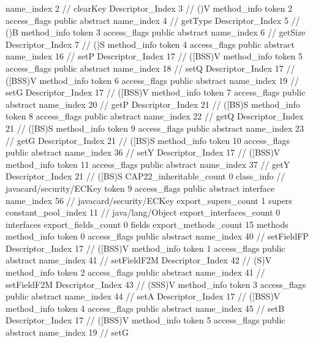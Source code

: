 {{{{{					name_index	2		// clearKey
					Descriptor_Index	3		// ()V
				}
				method_info {
					token	2
					access_flags	public abstract
					name_index	4		// getType
					Descriptor_Index	5		// ()B
				}
				method_info {
					token	3
					access_flags	public abstract
					name_index	6		// getSize
					Descriptor_Index	7		// ()S
				}
				method_info {
					token	4
					access_flags	public abstract
					name_index	16		// setP
					Descriptor_Index	17		// ([BSS)V
				}
				method_info {
					token	5
					access_flags	public abstract
					name_index	18		// setQ
					Descriptor_Index	17		// ([BSS)V
				}
				method_info {
					token	6
					access_flags	public abstract
					name_index	19		// setG
					Descriptor_Index	17		// ([BSS)V
				}
				method_info {
					token	7
					access_flags	public abstract
					name_index	20		// getP
					Descriptor_Index	21		// ([BS)S
				}
				method_info {
					token	8
					access_flags	public abstract
					name_index	22		// getQ
					Descriptor_Index	21		// ([BS)S
				}
				method_info {
					token	9
					access_flags	public abstract
					name_index	23		// getG
					Descriptor_Index	21		// ([BS)S
				}
				method_info {
					token	10
					access_flags	public abstract
					name_index	36		// setY
					Descriptor_Index	17		// ([BSS)V
				}
				method_info {
					token	11
					access_flags	public abstract
					name_index	37		// getY
					Descriptor_Index	21		// ([BS)S
				}
			}
			CAP22_inheritable_count	0
		}
		class_info {		// javacard/security/ECKey
			token	9
			access_flags	public abstract interface
			name_index	56		// javacard/security/ECKey
			export_supers_count	1
			supers {
				constant_pool_index	11		// java/lang/Object
			}
			export_interfaces_count	0
			interfaces {
			}
			export_fields_count	0
			fields {
			}
			export_methods_count	15
			methods {
				method_info {
					token	0
					access_flags	public abstract
					name_index	40		// setFieldFP
					Descriptor_Index	17		// ([BSS)V
				}
				method_info {
					token	1
					access_flags	public abstract
					name_index	41		// setFieldF2M
					Descriptor_Index	42		// (S)V
				}
				method_info {
					token	2
					access_flags	public abstract
					name_index	41		// setFieldF2M
					Descriptor_Index	43		// (SSS)V
				}
				method_info {
					token	3
					access_flags	public abstract
					name_index	44		// setA
					Descriptor_Index	17		// ([BSS)V
				}
				method_info {
					token	4
					access_flags	public abstract
					name_index	45		// setB
					Descriptor_Index	17		// ([BSS)V
				}
				method_info {
					token	5
					access_flags	public abstract
					name_index	19		// setG
}}}}}
